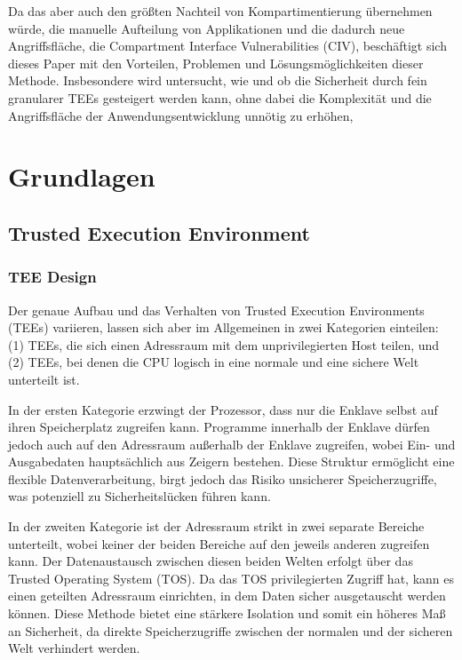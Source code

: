 \documentclass[sigconf]{acmart}
\begin{document}
Da das aber auch den größten Nachteil von Kompartimentierung übernehmen würde, die manuelle Aufteilung von Applikationen und die dadurch neue Angriffsfläche, die Compartment Interface Vulnerabilities (CIV), beschäftigt sich dieses Paper mit den Vorteilen, Problemen und Lösungsmöglichkeiten dieser Methode. Insbesondere wird untersucht, wie und ob die Sicherheit durch fein granularer TEEs gesteigert werden kann, ohne dabei die Komplexität und die Angriffsfläche der Anwendungsentwicklung unnötig zu erhöhen,

\section{Grundlagen}

\subsection{Trusted Execution Environment}

\subsubsection{TEE Design}

Der genaue Aufbau und das Verhalten von Trusted Execution Environments (TEEs) variieren, lassen sich aber im Allgemeinen in zwei Kategorien einteilen: (1) TEEs, die sich einen Adressraum mit dem unprivilegierten Host teilen, und (2) TEEs, bei denen die CPU logisch in eine normale und eine sichere Welt unterteilt ist.

In der ersten Kategorie erzwingt der Prozessor, dass nur die Enklave selbst auf ihren Speicherplatz zugreifen kann. Programme innerhalb der Enklave dürfen jedoch auch auf den Adressraum außerhalb der Enklave zugreifen, wobei Ein- und Ausgabedaten hauptsächlich aus Zeigern bestehen. Diese Struktur ermöglicht eine flexible Datenverarbeitung, birgt jedoch das Risiko unsicherer Speicherzugriffe, was potenziell zu Sicherheitslücken führen kann.

In der zweiten Kategorie ist der Adressraum strikt in zwei separate Bereiche unterteilt, wobei keiner der beiden Bereiche auf den jeweils anderen zugreifen kann. Der Datenaustausch zwischen diesen beiden Welten erfolgt über das Trusted Operating System (TOS). Da das TOS privilegierten Zugriff hat, kann es einen geteilten Adressraum einrichten, in dem Daten sicher ausgetauscht werden können. Diese Methode bietet eine stärkere Isolation und somit ein höheres Maß an Sicherheit, da direkte Speicherzugriffe zwischen der normalen und der sicheren Welt verhindert werden.
\end{document}
